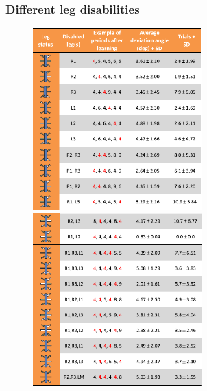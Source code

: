 \documentclass{beamer}
\begin{document}
\begin{frame}
\frametitle{Different leg disabilities}
\vspace*{-0.6cm}
\begin{figure}
\hspace*{-1cm}
\includegraphics[width=0.58\textwidth]{figs/disable-legs-list-1.pdf}
\includegraphics[width=0.58\textwidth]{figs/disable-legs-list-2.pdf}
\end{figure}
\end{frame}
\end{document}
